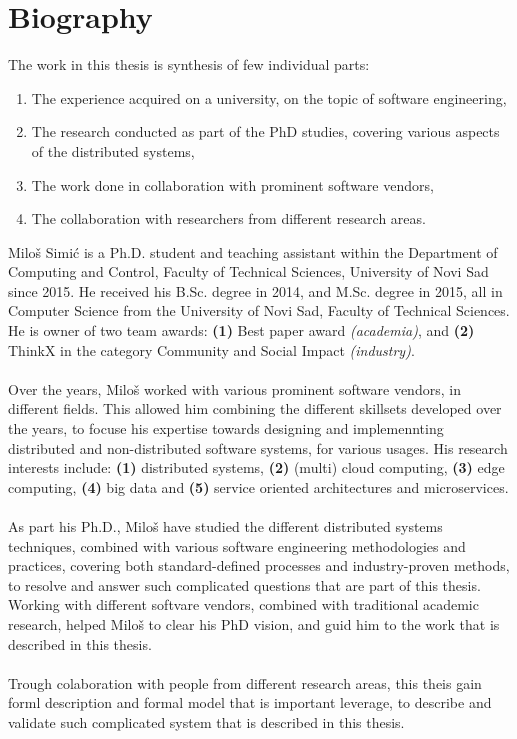 \chapter*{Biography}
%
The work in this thesis is synthesis of few individual parts:

\begin{enumerate}[start=1,label={(\bfseries \arabic*)}]
	\item The experience acquired on a university, on the topic of software engineering,
	\item The research conducted as part of the PhD studies, covering various aspects of the distributed systems,
	\item The work done in collaboration with prominent software vendors,
	\item The collaboration with researchers from different research areas.
\end{enumerate}

\noindent
Milo\v s Simi\'c is a Ph.D. student and teaching assistant within the Department of Computing and Control, Faculty of Technical Sciences, University of Novi Sad since 2015. He received his B.Sc. degree in 2014, and M.Sc. degree in 2015, all in Computer Science from the University of Novi Sad, Faculty of Technical Sciences. He is owner of two team awards: \textbf{(1)} Best paper award \emph{(academia)}, and \textbf{(2)} ThinkX in the category Community and Social Impact \emph{(industry)}.\\\\ 
\noindent
Over the years, Milo\v s worked with various prominent software vendors, in different fields. This allowed him combining the different skillsets developed over the years, to focuse his expertise towards designing and implemennting distributed and non-distributed software systems, for various usages. His research interests include: \textbf{(1)} distributed systems, \textbf{(2)} (multi) cloud computing, \textbf{(3)} edge computing, \textbf{(4)} big data and \textbf{(5)} service oriented architectures and microservices.\\\\
\noindent
As part his Ph.D., Milo\v s have studied the different distributed systems techniques, combined with various software engineering methodologies and practices, covering both standard-defined processes and industry-proven methods, to resolve and answer such complicated questions that are part of this thesis. Working with different softvare vendors, combined with traditional academic research, helped Milo\v s to clear his PhD vision, and guid him to the work that is described in this thesis.\\\\
\noindent
Trough colaboration with people from different research areas, this theis gain forml description and formal model that is important leverage, to describe and validate such complicated system that is described in this thesis.
%
%